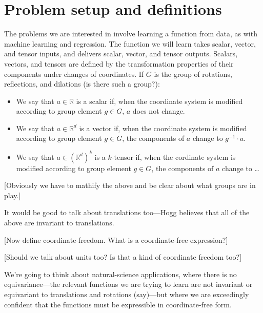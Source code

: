 \documentclass[12pt]{article}
\newcommand{\inv}{^{-1}}
\newcommand{\R}{{\mathbb R}}
\begin{document}
\section{Problem setup and definitions}

The problems we are interested in involve learning a function from data, as with machine learning and regression.
The function we will learn takes scalar, vector, and tensor inputs, and delivers scalar, vector, and tensor outputs.
Scalars, vectors, and tensors are defined by the transformation properties of their components under changes of coordinates.
If $G$ is the group of rotations, reflections, and dilations (is there such a group?):
\begin{itemize}
  \item We say that $a\in\R$ is a scalar if, when the coordinate system is modified according to group element $g\in G$, $a$ does not change.
  \item We say that $a\in\R^d$ is a vector if, when the coordinate system is modified according to group element $g\in G$, the components of $a$ change to $g\inv\cdot a$.
  \item We say that $a\in(\R^d)^k$ is a $k$-tensor if, when the cordinate system is modified according to group element $g\in G$, the components of $a$ change to \ldots
\end{itemize}
[Obviously we have to mathify the above and be clear about what groups are in play.]

It would be good to talk about translations too---Hogg believes that all of the above are invariant to translations.

[Now define coordinate-freedom. What is a coordinate-free expression?]

[Should we talk about units too? Is that a kind of coordinate freedom too?]

We're going to think about natural-science applications, where there is no equivariance---the relevant functions we are trying to learn are not invariant or equivariant to translations and rotations (say)---but where we are exceedingly confident that the functions must be expressible in coordinate-free form.
\end{document}
